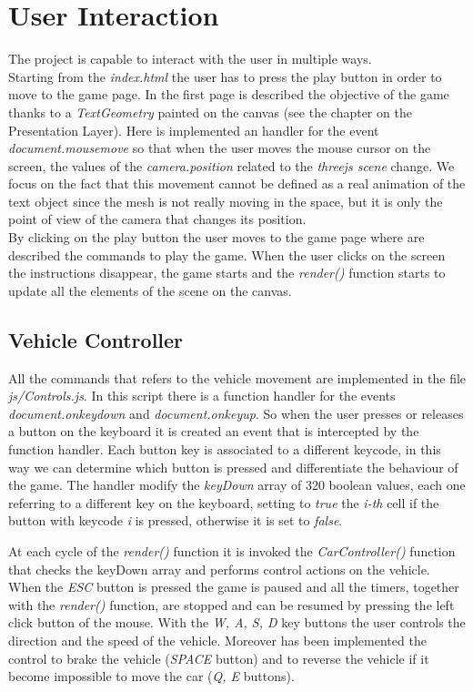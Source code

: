 \documentclass[a4paper, 11pt, titlepage]{report}
\begin{document}
\chapter{User Interaction}
	\par The project is capable to interact with the user in multiple ways. \\
	Starting from the \emph{index.html} the user has to press the play button in order to move to the game page. In the first page is described the objective of the game thanks to a \emph{TextGeometry} painted on the canvas (see the chapter on the Presentation Layer). Here is implemented an handler for the event \emph{document.mousemove} so that when the user moves the mouse cursor on the screen, the values of the \emph{camera.position} related to the \emph{threejs scene} change. We focus on the fact that this movement cannot be defined as a real animation of the text object since the mesh is not really moving in the space, but it is only the point of view of the camera that changes its position. \\
	By clicking on the play button the user moves to the game page where are described the commands to play the game. When the user clicks on the screen the instructions disappear, the game starts and the \emph{render()} function starts to update all the elements of the scene on the canvas.\\
	\section{Vehicle Controller}
		\par All the commands that refers to the vehicle movement are implemented in the file \emph{js/Controls.js}. In this script there is a function handler for the events \emph{document.onkeydown} and \emph{document.onkeyup}. So when the user presses or releases a button on the keyboard it is created an event that is intercepted by the function handler. Each button key is associated to a different keycode, in this way we can determine which button is pressed and differentiate the behaviour of the game. The handler modify the \emph{keyDown} array of 320 boolean values, each one referring to a different key on the keyboard, setting to \emph{true} the \emph{i-th} cell if the button with keycode \emph{i} is pressed, otherwise it is set to \emph{false}.
		\par At each cycle of the \emph{render()} function it is invoked the \emph{CarController()} function that checks the keyDown array and performs control actions on the vehicle.\\
		When the \emph{ESC} button is pressed the game is paused and all the timers, together with the \emph{render()} function, are stopped and can be resumed by pressing the left click button of the mouse. With the \emph{W, A, S, D} key buttons the user controls the direction and the speed of the vehicle. Moreover has been implemented the control to brake the vehicle (\emph{SPACE} button) and to reverse the vehicle if it become impossible to move the car (\emph{Q, E} buttons).\\
\end{document}
